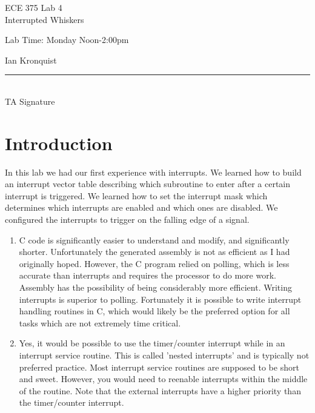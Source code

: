 \documentclass[12pt,letterpaper]{article}
\begin{document}
\begin{titlepage}
    \vspace*{4cm}
    \begin{flushright}
    {\huge
        ECE 375 Lab 4\\[1cm]
    }
    {\large
         Interrupted Whiskers
    }
    \end{flushright}
    \begin{flushleft}
    Lab Time: Monday Noon-2:00pm
    \end{flushleft}
    \begin{flushright}
    Ian Kronquist
    \vfill
    \rule{5in}{.5mm}\\
    TA Signature
    \end{flushright}

\end{titlepage}
\section{Introduction}
In this lab we had our first experience with interrupts. We learned how to build an interrupt vector table describing which subroutine to enter after a certain interrupt is triggered. We learned how to set the interrupt mask which determines which interrupts are enabled and which ones are disabled. We configured the interrupts to trigger on the falling edge of a signal.

\begin{enumerate}

\item C code is significantly easier to understand and modify, and significantly shorter. Unfortunately the generated assembly is not as efficient as I had originally hoped. However, the C program relied on polling, which is less accurate than interrupts and requires the processor to do more work. Assembly has the possibility of being considerably more efficient. Writing interrupts is superior to polling. Fortunately it is possible to write interrupt handling routines in C, which would likely be the preferred option for all tasks which are not extremely time critical.

\item Yes, it would be possible to use the timer/counter interrupt while in an interrupt service routine. This is called 'nested interrupts' and is typically not preferred practice. Most interrupt service routines are supposed to be short and sweet. However, you would need to reenable interrupts within the middle of the routine. Note that the external interrupts have a higher priority than the timer/counter interrupt.
\end{enumerate}
\end{document}
